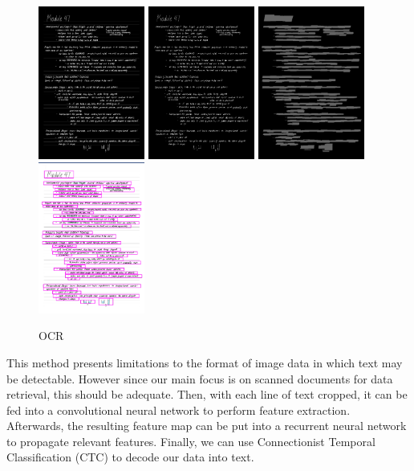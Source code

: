 \documentclass[11pt, a4paper, twocolumn]{article}
\begin{document}
\begin{figure}[htp]
    \centering
    \includegraphics[width=3.5cm]{1.png}
    \includegraphics[width=3.5cm]{2.png}
    \includegraphics[width=3.5cm]{3.png}
    \includegraphics[width=3.5cm]{4.png}
    \caption{OCR}
    \label{fig:cnn}
\end{figure}

This method presents limitations to the format of image data in which text may be detectable. However since our main focus is on scanned documents for data retrieval, this should be adequate. Then, with each line of text cropped, it can be fed into a convolutional neural network to perform feature extraction. Afterwards, the resulting feature map can be put into a recurrent neural network to propagate relevant features. Finally, we can use Connectionist Temporal Classification (CTC) to decode our data into text.
\end{document}
